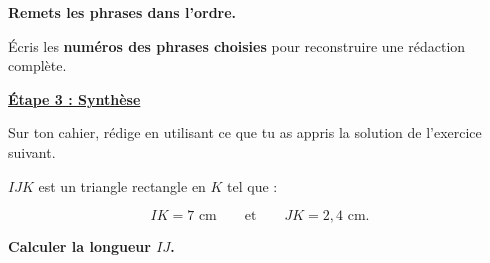 \documentclass[12pt,a4paper]{article}
\begin{document}
\vspace{0.35em}


\begin{tcolorbox}[
  enhanced,
  colback=ActionC!5,
  colframe=ActionC!55,
  boxrule=0.6pt,
  arc=1.5mm,
  left=3mm,
  right=3mm,
  top=1.3mm,
  bottom=1.3mm
]

{\sffamily\bfseries\color{ActionC}
Remets les phrases dans l'ordre.}

\smallskip

Écris les \textbf{numéros des phrases choisies} pour reconstruire
une rédaction complète.

\medskip

\begin{center}
\boxed{\phantom{13}}
\;\longrightarrow\;
\boxed{\phantom{13}}
\;\longrightarrow\;
\boxed{\phantom{13}}
\;\longrightarrow\;
\boxed{\phantom{13}}
\;\longrightarrow\;
\boxed{\phantom{13}}
\;\longrightarrow\;
\boxed{\phantom{13}}
\;\longrightarrow\;
\boxed{\phantom{13}}
\;\longrightarrow\;
\boxed{\phantom{13}}
\end{center}

\end{tcolorbox}


\vspace{0.45em}


{\sffamily\large\bfseries\underline{Étape 3 : Synthèse}}

\smallskip

Sur ton cahier, rédige en utilisant ce que tu as appris
la solution de l'exercice suivant.

\medskip

\begin{tcolorbox}[
  enhanced,
  colback=NeutreBg,
  colframe=NeutreC!45,
  boxrule=0.5pt,
  arc=1.5mm,
  left=3mm,
  right=3mm,
  top=1.4mm,
  bottom=1.4mm
]

\(IJK\) est un triangle rectangle en \(K\) tel que :

\[
IK=7\text{ cm}
\qquad\text{et}\qquad
JK=2{,}4\text{ cm}.
\]

\textbf{Calculer la longueur \(IJ\).}

\end{tcolorbox}
\end{document}
